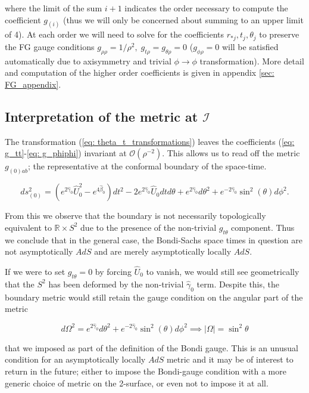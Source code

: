 \documentclass[a4paper,11pt]{article}
\numberwithin{equation}{section}
\begin{document}
\noindent where the limit of the sum $i+1$ indicates the order necessary to compute the coefficient $g_{(i)}$ (thus we will only be concerned about summing to an upper limit of 4). At each order we will need to solve for the coefficients $ r_{* j}, t_{j}, \theta_{j}$ to preserve the FG gauge conditions $g_{\rho \rho}=1/\rho^2,\; g_{t \rho}=g_{\theta \rho}=0$ ($g_{\phi \rho}=0$ will be satisfied automatically due to axisymmetry and trivial $\phi \rightarrow \phi$ transformation). More detail and computation of the higher order coefficients is given in appendix \ref{sec: FG_appendix}.

\subsection{Interpretation of the metric at $\mathscr{I}$}

\noindent The transformation (\ref{eq: theta_t_transformations}) leaves the coefficients (\ref{eq: g_tt}-\ref{eq: g_phiphi}) invariant at $\mathcal{O}(\rho^{-2})$. This allows us to read off the metric $g_{(0)ab}$; the representative at the conformal boundary of the space-time. 

\begin{equation} \label{eq: g_(0)}
ds_{(0)}^2=(e^{2\hat{\gamma}_{0}}\hat{U}_{0}^2-e^{4\hat{\beta}_{0}})dt^2-2e^{2\hat{\gamma}_{0}}\hat{U}_{0}dtd\theta+e^{2\hat{\gamma}_{0}}d\theta^2+e^{-2\hat{\gamma}_{0}}\sin^2(\theta)d\phi^2.
\end{equation}

From this we observe that the boundary is not necessarily topologically equivalent to $\mathbb{R} \times S^2$ due to the presence of the non-trivial $g_{t \theta}$ component. Thus we conclude that in the general case, the Bondi-Sachs space times in question are not asymptotically $AdS$ and are merely asymptotically locally $AdS$. \par

If we were to set $g_{t \theta}=0$ by forcing $\hat{U}_0$ to vanish, we would still see geometrically that the $S^2$ has been deformed by the non-trivial $\hat{\gamma}_0$ term. Despite this, the  boundary metric would still retain the gauge condition on the angular part of the metric 

\begin{equation}
d\Omega^2=e^{2\hat{\gamma}_{0}}d\theta^2+e^{-2\hat{\gamma}_{0}}\sin^2(\theta)d\phi^2 \implies |\Omega|=\sin^2 \theta
\end{equation}

\noindent that we imposed as part of the definition of the Bondi gauge. This is an unusual condition for an asymptotically locally $AdS$ metric and it may be of interest to return in the future; either to impose the Bondi-gauge condition with a more generic choice of metric on the 2-surface, or even not to impose it at all.
\end{document}

